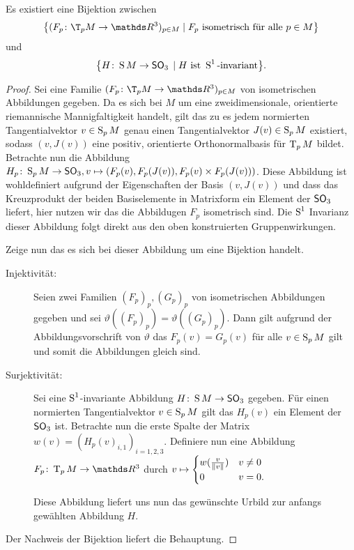 \begin{Satz}
  Es existiert eine Bijektion zwischen
  \begin{gather*}
    \set{ (\abb{F_p}{\T_pM}{\R^3})_{p\in M} }{ F_p \text{ isometrisch
        für alle }p \in M}
  \end{gather*}
  und
  \begin{gather*}
    \set{ \abb{H}{\S M}{\so_3}}{H\text{ ist }\S^1 \text{-invariant}}.
  \end{gather*}
  \begin{proof}
    Sei eine Familie $(\abb{F_p}{\T_pM}{\R^3})_{p\in M}$ von
    isometrischen Abbildungen gegeben.  Da es sich bei $M$ um eine
    zweidimensionale, orientierte riemannische Mannigfaltigkeit
    handelt, gilt das zu es jedem normierten Tangentialvektor
    $v \in \S_p M$ genau einen Tangentialvektor $J(v) \in \S_p M$
    existiert, sodass $(v,J(v))$ eine positiv, orientierte
    Orthonormalbasis für $\tang{p}{M}$ bildet. Betrachte nun die
    Abbildung $\abb{H_p}{\S_p%
      M}{\so_3}, v \mapsto (F_p(v),F_p(J(v)),F_p(v)\times F_p(J(v)))$.
    Diese Abbildung ist wohldefiniert aufgrund der Eigenschaften der
    Basis $(v,J(v))$ und dass das Kreuzprodukt der beiden
    Basiselemente in Matrixform ein Element der $\so_3$ liefert, hier nutzen wir das die Abbildugen $ F_p $ isometrisch sind.  Die
    $\S^1$ Invarianz dieser Abbildung folgt direkt aus den oben
    konstruierten Gruppenwirkungen.   
	
    Zeige nun das es sich bei dieser Abbildung um eine Bijektion
    handelt.
    \begin{description}
    \item[Injektivität:] Seien zwei Familien $(F_p)_p,(G_p)_p$ von
      isometrischen Abbildungen gegeben und sei
      $\vartheta((F_p)_p)=\vartheta((G_p)_p)$. Dann gilt aufgrund der
      Abbildungsvorschrift von $\vartheta$ das $F_p(v)=G_p(v)$ für
      alle $v \in \S_p M$ gilt und somit die Abbildungen gleich sind.
    \item[Surjektivität:] Sei eine $\S^1$-invariante Abbildung
      $\abb{H}{\S M}{\so_3}$ gegeben. Für einen normierten
      Tangentialvektor $v \in \S_p M$ gilt das $H_p(v)$ ein Element
      der $\so_3$ ist. Betrachte nun die erste Spalte der Matrix
      $w(v)=(H_p(v)_{i,1})_{i=1,2,3}$. Definiere nun eine Abbildung
      $\abb{F_p}{\tang{p}{M}}{\R^3}$ durch $v \mapsto \begin{cases}
        w(\frac{v}{\norm{v}}) & v \neq 0 \\
        0 & v=0.
      \end{cases}$
		
      Diese Abbildung liefert uns nun das gewünschte Urbild zur
      anfangs gewählten Abbildung $H$.
    \end{description}
    Der Nachweis der Bijektion liefert die Behauptung.
\end{proof}

\end{Satz}


